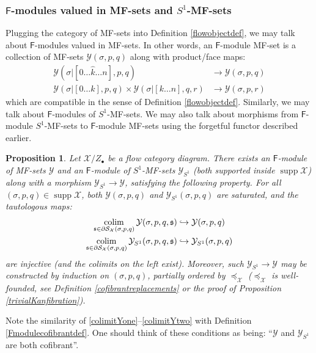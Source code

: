 \documentclass[12pt]{article}
\newtheorem{proposition}[theorem]{Proposition}
\theoremstyle{definition}
\theoremstyle{remark}
\numberwithin{equation}{subsection}
\newcommand{\s}{\mathfrak s}
\newcommand{\X}{\mathcal X}
\newcommand{\Y}{\mathcal Y}
\newcommand{\SSS}{\mathcal S}
\newcommand{\colim}{\operatornamewithlimits{colim}}
\newcommand{\sF}{\mathsf{F}}
\newcommand{\supp}{\operatorname{supp}}
\begin{document}
\subsubsection{$\sF$-modules valued in MF-sets and $S^1$-MF-sets}

Plugging the category of MF-sets into Definition \ref{flowobjectdef}, we may talk about $\sF$-modules valued in MF-sets.  In other words, an $\sF$-module MF-set is a collection of MF-sets $\Y(\sigma,p,q)$ along with product/face maps:
\begin{align}
\Y(\sigma|[0\ldots\hat k\ldots n],p,q)&\to\Y(\sigma,p,q)\\
\Y(\sigma|[0\ldots k],p,q)\times\Y(\sigma|[k\ldots n],q,r)&\to\Y(\sigma,p,r)
\end{align}
which are compatible in the sense of Definition \ref{flowobjectdef}.  Similarly, we may talk about $\sF$-modules of $S^1$-MF-sets.  We may also talk about morphisms from $\sF$-module $S^1$-MF-sets to $\sF$-module MF-sets using the forgetful functor described earlier.

\begin{proposition}\label{inductionformodels}
Let $\X/Z_\bullet$ be a flow category diagram.  There exists an $\sF$-module of MF-sets $\Y$ and an $\sF$-module of $S^1$-MF-sets $\Y_{S^1}$ (both supported inside $\supp\X$) along with a morphism $\Y_{S^1}\to\Y$, satisfying the following property.  For all $(\sigma,p,q)\in\supp\X$, both $\Y(\sigma,p,q)$ and $\Y_{S^1}(\sigma,p,q)$ are saturated, and the tautologous maps:
\begin{align}
\label{colimitYone}\colim_{\s\in\partial\SSS_\X(\sigma,p,q)}\Y(\sigma,p,q,\s)&\hookrightarrow\Y(\sigma,p,q)\\
\label{colimitYtwo}\colim_{\s\in\partial\SSS_\X(\sigma,p,q)}\Y_{S^1}(\sigma,p,q,\s)&\hookrightarrow\Y_{S^1}(\sigma,p,q)
\end{align}
are injective (and the colimits on the left exist).  Moreover, such $\Y_{S^1}\to\Y$ may be constructed by induction on $(\sigma,p,q)$, partially ordered by $\preceq_\X$ ($\preceq_\X$ is well-founded, see Definition \ref{cofibrantreplacements} or the proof of Proposition \ref{trivialKanfibration}).
\end{proposition}

Note the similarity of \eqref{colimitYone}--\eqref{colimitYtwo} with Definition \ref{Fmodulecofibrantdef}.  One should think of these conditions as being: ``$\Y$ and $\Y_{S^1}$ are both cofibrant''.
\end{document}
